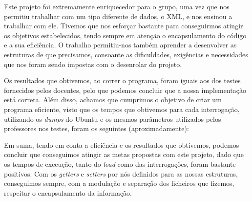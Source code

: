 \documentclass[a4paper, 11pt, oneside]{article}
\begin{document}
Este projeto foi extremamente enriquecedor para o grupo, uma vez que nos permitiu trabalhar com um tipo diferente de dados, o XML, e nos ensinou a trabalhar com ele. 
Tivemos que nos esforçar bastante para conseguirmos atingir os objetivos estabelecidos, tendo sempre em atenção o encapsulamento do código e a sua eficiência. O trabalho 
permitiu-nos também aprender a desenvolver as estruturas de que precisamos, consoante as dificuldades, exigências e necessidades que nos foram sendo impostas com o 
desenrolar do projeto.

Os resultados que obtivemos, ao correr o programa, foram iguais aos dos testes fornecidos pelos docentes, pelo que podemos concluir que a nossa implementação está correta. 
Além disso, achamos que cumprimos o objetivo de criar um programa eficiente, visto que os tempos que obtivemos para cada interrogação, utilizando os \textit{dumps} do 
Ubuntu e os mesmos parâmetros utilizados pelos professores nos testes, foram os seguintes (aproximadamente):


Em suma, tendo em conta a eficiência e os resultados que obtivemos, podemos concluir que conseguimos atingir as metas propostas com este projeto, dado que os tempos de 
execução, tanto do \textit{load} como das interrogações, foram bastante positivos. Com os \textit{getters} e \textit{setters} por nós definidos para as nossas estruturas, 
conseguimos sempre, com a modulação e separação dos ficheiros que fizemos, respeitar o encapsulamento da informação.
\end{document}
